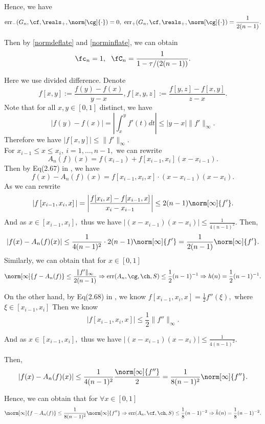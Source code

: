 Hence, we have
$$\err_{-}(G_n,\cf,\reals_{+},\norm[\cg]{\cdot})=0, \ \err_{+}(G_n,\cf,\reals_{+},\norm[\cg]{\cdot}) =\frac{1}{2(n-1)}.
$$

Then by \eqref{normdeflate} and \eqref{norminflate}, we can obtain
\begin{equation}\label{inflaapprox}
\fc_n=1, \ \   \fC_n =\frac{1}{1 - \tau /(2(n-1))}.
\end{equation}

Here we use divided difference. Denote
$$f[x,y]:=\frac{f(y)-f(x)}{y-x},f[x,y,z]:=\frac{f[y,z]-f[x,y]}{z-x}.$$
Note that for all $x,y \in [0,1]$ distinct, we have
 $$|f(y)-f(x)|=\left|\int_{x}^{y}f'(t)dt\right| \leq |y-x|\|f'\|_{\infty}.$$
 Therefore we have $|f[x,y]|\leq \|f'\|_{\infty}.$\\
For $x_{i-1} \leq x \leq x_i, \ i=1, \ldots, n-1,$ we  can rewrite
$$A_{n}(f)(x)=f\left(x_{i-1}\right)+f\left[x_{i-1},x_{i}\right]\left(x-x_{i-1}\right).$$
Then by Eq(2.67) in \cite{walter}, we have
$$
f(x)-A_{n}(f)(x)
=f\left[x_{i-1},x_{i},x\right]\cdot (x-x_{i-1})(x-x_i).
$$
As we can rewrite
$$|f\left[x_{i-1},x_{i},x\right]|=\left|\frac{f[x_{i},x]-f[x_{i-1},x]}{x_i-x_{i-1}}\right|\leq2(n-1)\norm[\infty]{f'}.$$
And as $x \in \left[x_{i-1},x_{i} \right],$ thus we have
$\left|(x-x_{i-1})(x-x_{i})\right| \leq \frac{1}{4(n-1)^2}.$
Then,
$$
|f(x)-A_{n}(f)(x)|\leq \frac{1}{4(n-1)^2}\cdot 2(n-1)\norm[\infty]{f'}=\frac{1}{2(n-1)}\norm[\infty]{f'}.
$$
Similarly, we can obtain that for $x \in [0,1]$
$$\norm[\infty]{f-A_{n}(f)} \leq \frac{\|f'\|_{\infty}}{2(n-1)} \Rightarrow \err(A_n,\cg,\ch,S) \leq \frac{1}{2}(n-1)^{-1} \Rightarrow h(n)=\frac{1}{2}(n-1)^{-1}.$$

On the other hand, by Eq(2.68) in \cite{walter},
we know
$f\left[x_{i-1},x_{i},x\right]=\frac{1}{2}f''(\xi),$ where $\xi \in [x_{i-1},x_{i}]$
Then we know
$$
|f\left[x_{i-1},x_{i},x\right] |\leq \frac{1}{2}\|f''\|_{\infty}.$$

And as $x \in \left[x_{i-1},x_{i} \right],$ thus we have
$\left|(x-x_{i-1})(x-x_{i})\right| \leq \frac{1}{4(n-1)^2}.$

Then,
$$
|f(x)-A_{n}(f)(x)|\leq \frac{1}{4(n-1)^2}\frac{\norm[\infty]{f''}}{2}=\frac{1}{8(n-1)^2}\norm[\infty]{f''}.
$$

Hence, we can obtain that for $\forall x \in [0,1]$
$$\norm[\infty]{f-A_{n}(f)} \leq  \frac{1}{8(n-1)^{2}}\norm[\infty]{f''} \Rightarrow \err(A_n,\cf,\ch,S) \leq \frac{1}{8}(n-1)^{-2}
\Rightarrow \tilde{h}(n)=\frac{1}{8}(n-1)^{-2}.$$



